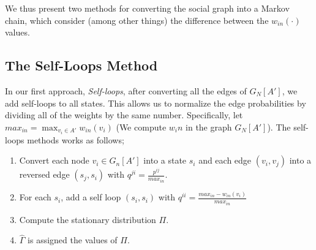 \documentclass[sigconf,anonymous]{aamas}
\begin{document}
We thus present two methods for converting the social graph into a Markov chain, which consider (among other things) the difference between the $w_{in}(\cdot)$ values.

\subsection{The Self-Loops Method}



% 



 


In our first approach, \textit{Self-loops}, after converting all the edges of $G_N[A']$, we add self-loops to all states. This allows us to normalize the edge probabilities by dividing all of the weights by the same number. Specifically, let $max_{in} = \max_{v_i\in A'} w_{in}(v_i)$ (We compute $w_in$ in the graph $G_N[A']$).
The self-loops methods works as follows;
\begin{enumerate}
    \item Convert each node $v_i \in G_n[A']$ into a state $s_i$ and each edge $(v_i,v_j)$ into a reversed edge $(s_j,s_i)$ with $q^{ji} = \frac{p^{ij}}{max_{in}}$.
    \item For each $s_i$, add a self loop $(s_i,s_i)$ with $q^{ii}=\frac{max_{in}-w_{in}(v_i)}{max_{in}}$
    \item Compute the stationary distribution $\Pi$.
    \item $\hat{\Gamma}$ is assigned the values of $\Pi$. 
\end{enumerate}
\end{document}
